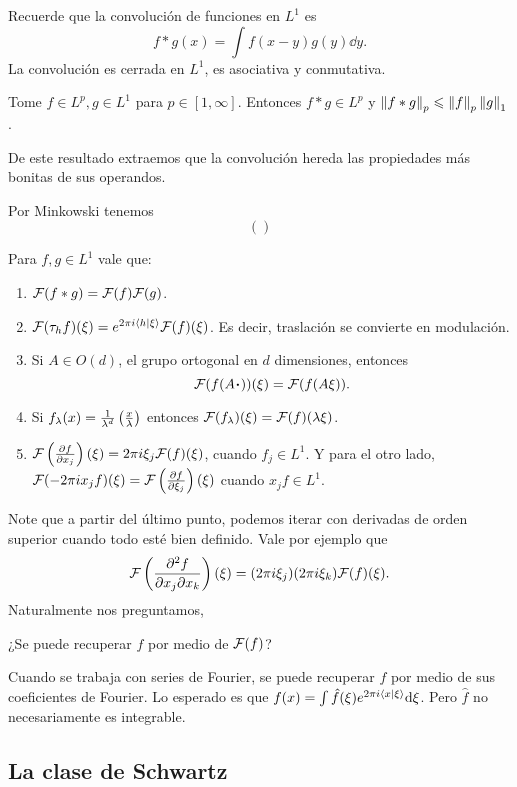 \documentclass[12pt]{memoir}
\begin{document}
Recuerde que la convolución de funciones en $L^1$ es
$$f\ast g(x)=\int f(x-y)g(y)\dd y.$$
La convolución es cerrada en $L^1$, es asociativa y conmutativa.

\begin{Th}
  Tome $f\in L^p, g\in L^1$ para $p\in [1,\infty]$. Entonces $f\ast g\in L^p$ y $\left\|f\ast g\right\|_p\leqslant\left\|f\right\|_p\left\|g\right\|_1$.
\end{Th}

De este resultado extraemos que la convolución hereda las propiedades más bonitas de sus operandos. 

\begin{ptcbp}
  Por Minkowski tenemos 
  $$\left(\right)$$
\end{ptcbp}

\begin{Prop}
  Para $f,g\in L^1$ vale que:
  \begin{enumerate}
    \item $\mathcal{F}(f\ast g)=\mathcal{F}(f)\mathcal{F}(g)$.
    \item $\mathcal{F}(\tau_h f)(\xi)=e^{2\pi i\braket{h}{\xi}}\mathcal{F}(f)(\xi)$. Es decir, traslación se convierte en modulación.
    \item Si $A\in O(d)$, el grupo ortogonal en $d$ dimensiones, entonces
    $$\cF(f(A\.))(\xi)=\cF(f(A\xi)).$$
    \item Si $f_\lambda(x)=\frac{1}{\lambda^d}\left(\frac{x}{\lambda}\right)$ entonces $\mathcal{F}(f_\lambda)(\xi)=\mathcal{F}(f)(\lambda\xi)$.
    \item $\mathcal{F}\left(\pdv{f}{x_j}\right)(\xi)=2\pi i\xi_j\mathcal{F}(f)(\xi)$, cuando $f_j\in L^1$. Y para el otro lado, $\mathcal{F}(-2\pi ix_j f)(\xi)=\mathcal{F}\left(\pdv{f}{\xi_j}\right)(\xi)$ cuando $x_jf\in L^1$.
  \end{enumerate}
\end{Prop}

Note que a partir del último punto, podemos iterar con derivadas de orden superior cuando todo esté bien definido. Vale por ejemplo que
$$\mathcal{F}\left(\pdv[2]{f}{x_j}{x_k}\right)(\xi)=(2\pi i\xi_j)(2\pi i\xi_k)\mathcal{F}(f)(\xi).$$
Naturalmente nos preguntamos, 
\begin{significant}
  ¿Se puede recuperar $f$ por medio de $\mathcal{F}(f)$?
\end{significant}
Cuando se trabaja con series de Fourier, se puede recuperar $f$ por medio de sus coeficientes de Fourier. Lo esperado es que $f(x)=\int\hat{f}(\xi)e^{2\pi i\braket{x}{\xi}}\dd\xi$. Pero $\hat{f}$ no necesariamente es integrable.

\subsection{La clase de Schwartz}
\end{document}
